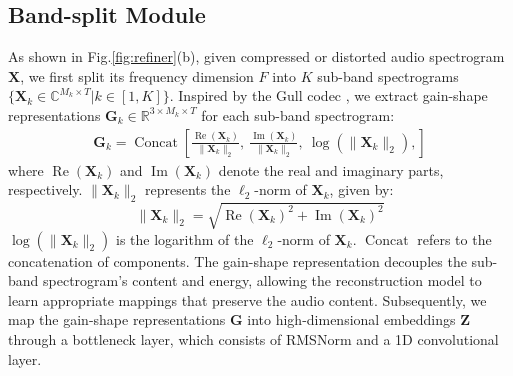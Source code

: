 \subsection{Band-split Module}
As shown in Fig.\ref{fig:refiner}(b), given compressed or distorted audio spectrogram $\mathbf{X}$, we first split its frequency dimension $F$ into $K$ sub-band spectrograms $\{\mathbf{X}_k\in \mathbb{C}^{M_k\times T} | k\in [1, K]\}$. Inspired by the Gull codec \cite{luo2024gull}, we extract gain-shape representations $\mathbf{G}_k\in \mathbb{R}^{3\times M_k\times T}$ for each sub-band spectrogram:
\begin{equation}
\begin{aligned}
\mathbf{G}_{k} = \operatorname{Concat} \left[ 
\frac{\operatorname{Re}(\mathbf{X}_{k})}{\|\mathbf{X}_{k}\|_2}, \ 
\frac{\operatorname{Im}(\mathbf{X}_{k})}{\|\mathbf{X}_{k}\|_2}, \ 
\log\left(\|\mathbf{X}_{k}\|_2\right),
\right]
\end{aligned}
\end{equation}
where $\operatorname{Re}(\mathbf{X}_{k})$ and $\operatorname{Im}(\mathbf{X}_{k})$ denote the real and imaginary parts, respectively. $\|\mathbf{X}_{k}\|_2$ represents the $\ell_2$-norm of $\mathbf{X}_{k}$, given by:
\begin{equation}
    \|\mathbf{X}_{k}\|_2 = \sqrt{\operatorname{Re}(\mathbf{X}_{k})^2 + \operatorname{Im}(\mathbf{X}_{k})^2}
\end{equation}
$\log\left(\|\mathbf{X}_{k}\|_2\right)$ is the logarithm of the $\ell_2$-norm of $\mathbf{X}_{k}$. $\operatorname{Concat}$ refers to the concatenation of components. The gain-shape representation decouples the sub-band spectrogram's content and energy, allowing the reconstruction model to learn appropriate mappings that preserve the audio content. Subsequently, we map the gain-shape representations $\mathbf{G}$ into high-dimensional embeddings $\mathbf{Z}$ through a bottleneck layer, which consists of RMSNorm \cite{zhang2019root} and a 1D convolutional layer.

